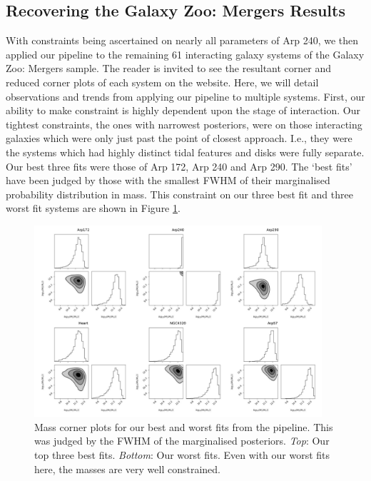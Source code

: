 \subsection{Recovering the Galaxy Zoo: Mergers Results}
\noindent With constraints being ascertained on nearly all parameters of Arp 240, we then applied our pipeline to the remaining 61 interacting galaxy systems of the Galaxy Zoo: Mergers sample. The reader is invited to see the resultant corner and reduced corner plots of each system on the website. Here, we will detail observations and trends from applying our pipeline to multiple systems. First, our ability to make constraint is highly dependent upon the stage of interaction. Our tightest constraints, the ones with narrowest posteriors, were on those interacting galaxies which were only just past the point of closest approach. I.e., they were the systems which had highly distinct tidal features and disks were fully separate. Our best three fits were those of Arp 172, Arp 240 and Arp 290. The `best fits' have been judged by those with the smallest FWHM of their marginalised probability distribution in mass. This constraint on our three best fit and three worst fit systems are shown in Figure \ref{fig:mass_constraint}.

\begin{figure}
    \centering
    \includegraphics[width=0.95\textwidth]{Chapter1/figures/masses-comb.pdf}
    \caption{Mass corner plots for our best and worst fits from the pipeline. This was judged by the FWHM of the marginalised posteriors. \textit{Top}: Our top three best fits. \textit{Bottom}: Our worst fits. Even with our worst fits here, the masses are very well constrained.}
    \label{fig:mass_constraint}
\end{figure}

